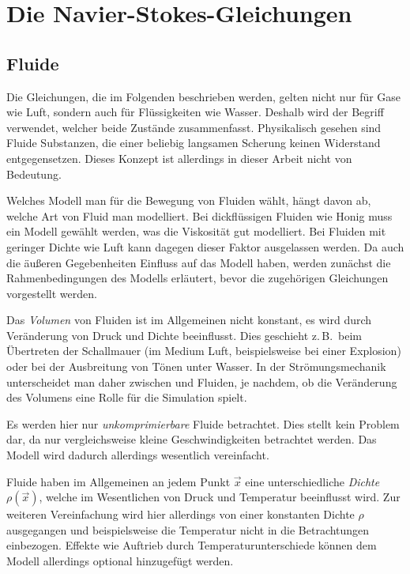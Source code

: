 \section{Die Navier-Stokes-Gleichungen}
\label{sec:navier_stokes}

\subsection{Fluide}

Die Gleichungen, die im Folgenden beschrieben werden, gelten nicht nur
für Gase wie Luft, sondern auch für Flüssigkeiten wie Wasser. Deshalb
wird der Begriff  verwendet,
welcher beide Zustände zusammenfasst. Physikalisch gesehen sind
Fluide Substanzen, die einer beliebig langsamen Scherung keinen
Widerstand entgegensetzen. Dieses Konzept ist allerdings in dieser
Arbeit nicht von Bedeutung.

Welches Modell man für die Bewegung von Fluiden wählt, hängt davon ab,
welche Art von Fluid man modelliert. Bei dickflüssigen Fluiden wie
Honig muss ein Modell gewählt werden, was die Viskosität gut
modelliert. Bei Fluiden mit geringer Dichte wie Luft kann dagegen
dieser Faktor ausgelassen werden. Da auch die äußeren Gegebenheiten
Einfluss auf das Modell haben, werden zunächst die Rahmenbedingungen
des Modells erläutert, bevor die zugehörigen Gleichungen vorgestellt
werden.

Das \emph{Volumen} von Fluiden ist im Allgemeinen nicht konstant, es
wird durch Veränderung von Druck und Dichte beeinflusst. Dies
geschieht z.\,B.\ beim Übertreten der Schallmauer (im Medium Luft,
beispielsweise bei einer Explosion) oder bei der Ausbreitung von Tönen
unter Wasser. In der Strömungsmechanik unterscheidet man daher
zwischen  und
 Fluiden, je nachdem, ob die
Veränderung des Volumens eine Rolle für die Simulation spielt.

Es werden hier nur \emph{unkomprimierbare} Fluide betrachtet. Dies
stellt kein Problem dar, da nur vergleichsweise kleine
Geschwindigkeiten betrachtet werden.  Das Modell wird dadurch
allerdings wesentlich vereinfacht.

Fluide haben im Allgemeinen an jedem Punkt $\vec{x}$ eine
unterschiedliche \emph{Dichte} $\rho(\vec{x})$, welche im Wesentlichen
von Druck und Temperatur beeinflusst wird. Zur weiteren Vereinfachung
wird hier allerdings von einer konstanten Dichte $\rho$ ausgegangen
und beispielsweise die Temperatur nicht in die Betrachtungen
einbezogen. Effekte wie Auftrieb durch Temperaturunterschiede können
dem Modell allerdings optional hinzugefügt werden.

